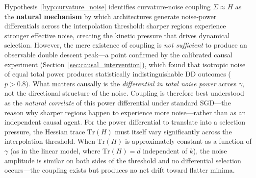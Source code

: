 \documentclass[
  journal=largetwo,
  simfonts=false,
  year=2025,
  volume=37,
]{cup-journal}
\begin{document}
\begin{remark}\label{rmk:sharpness_gradient_condition}
Hypothesis~\ref{hyp:curvature_noise} identifies curvature-noise coupling $\Sigma \approx H$ as the \textbf{natural mechanism} by which architectures generate noise-power differentials across the interpolation threshold: sharper regions experience stronger effective noise, creating the kinetic pressure that drives dynamical selection. However, the mere existence of coupling is \textit{not sufficient} to produce an observable double descent peak---a point confirmed by the calibrated causal experiment (Section~\ref{sec:causal_intervention}), which found that isotropic noise of equal total power produces statistically indistinguishable DD outcomes ($p > 0.8$). What matters causally is the \textit{differential in total noise power} across $\gamma$, not the directional structure of the noise. Coupling is therefore best understood as the \textit{natural correlate} of this power differential under standard SGD---the reason why sharper regions happen to experience more noise---rather than as an independent causal agent. For the power differential to translate into a selection pressure, the Hessian trace $\mathrm{Tr}(H)$ must itself vary significantly across the interpolation threshold. When $\mathrm{Tr}(H)$ is approximately constant as a function of $\gamma$ (as in the linear model, where $\mathrm{Tr}(H) = d$ independent of $k$), the noise amplitude is similar on both sides of the threshold and no differential selection occurs---the coupling exists but produces no net drift toward flatter minima.


\end{remark}
\end{document}
